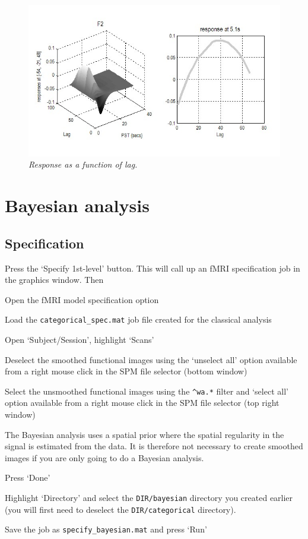 \begin{figure}
\begin{center}
\includegraphics[width=150mm]{faces/famous_lag}
\caption{\em Response as a function of lag. \label{famous_lag} }
\end{center}
\end{figure}


\section{Bayesian analysis}


\subsection{Specification}

Press the `Specify 1st-level' button. This will call up an fMRI specification job in the graphics window. Then

\bi
\item{Open the fMRI model specification option}
\item{Load the \verb!categorical_spec.mat! job file created for the 
classical analysis}
\item{Open `Subject/Session', highlight `Scans'} \item{Deselect the smoothed functional images using the `unselect all' option available from a right mouse click in the SPM file selector (bottom window)}
\item{Select the 
unsmoothed functional images using the \verb!^wa.*! filter and `select all' option available from a right mouse click in the SPM file selector (top right window)

The Bayesian analysis uses a spatial prior where the spatial regularity in the signal is estimated from the data. It is therefore not necessary to create smoothed images if you are only going to do a Bayesian analysis.}
\item{Press `Done'}
\item{Highlight `Directory' and select the 
\verb!DIR/bayesian! directory you created earlier (you will first need to deselect the \verb!DIR/categorical! directory).}
\item{Save the job as \verb!specify_bayesian.mat! and press `Run'}
\ei


